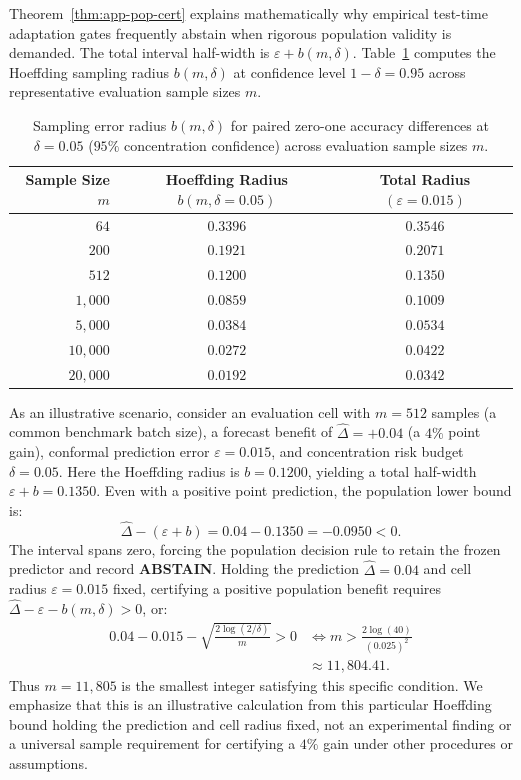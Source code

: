 Theorem~\ref{thm:app-pop-cert} explains mathematically why empirical test-time adaptation gates frequently abstain
when rigorous population validity is demanded. The total interval half-width is $\varepsilon + b(m, \delta)$.
Table~\ref{tab:sample-size-hoeffding} computes the Hoeffding sampling radius $b(m, \delta)$ at confidence level
$1 - \delta = 0.95$ across representative evaluation sample sizes $m$.

\begin{table}[!ht]
\centering
\footnotesize
\caption{Sampling error radius $b(m, \delta)$ for paired zero-one accuracy differences at $\delta = 0.05$
($95\%$ concentration confidence) across evaluation sample sizes $m$.}
\label{tab:sample-size-hoeffding}
\begin{tabular}{@{}rcc@{}}
\toprule
\shortstack{Sample\\Size $m$} & \shortstack{Hoeffding Radius\\$b(m, \delta=0.05)$} & \shortstack{Total Radius\\$(\varepsilon = 0.015)$} \\
\midrule
$64$ & $0.3396$ & $0.3546$ \\
$200$ & $0.1921$ & $0.2071$ \\
$512$ & $0.1200$ & $0.1350$ \\
$1{,}000$ & $0.0859$ & $0.1009$ \\
$5{,}000$ & $0.0384$ & $0.0534$ \\
$10{,}000$ & $0.0272$ & $0.0422$ \\
$20{,}000$ & $0.0192$ & $0.0342$ \\
\bottomrule
\end{tabular}
\end{table}

As an illustrative scenario, consider an evaluation cell with $m = 512$ samples (a common benchmark batch size),
a forecast benefit of $\widehat\Delta = +0.04$ (a $4\%$ point gain), conformal prediction error $\varepsilon = 0.015$,
and concentration risk budget $\delta = 0.05$. Here the Hoeffding radius is $b = 0.1200$, yielding a total half-width
$\varepsilon + b = 0.1350$. Even with a positive point prediction, the population lower bound is:
\[
 \widehat\Delta - (\varepsilon + b) = 0.04 - 0.1350 = -0.0950 < 0.
\]
The interval spans zero, forcing the population decision rule to retain the frozen predictor and record \textbf{ABSTAIN}.
Holding the prediction $\widehat\Delta = 0.04$ and cell radius $\varepsilon = 0.015$ fixed, certifying a positive
population benefit requires $\widehat\Delta - \varepsilon - b(m, \delta) > 0$, or:
\begin{align*}
 0.04 - 0.015 - \sqrt{\frac{2\log(2/\delta)}{m}} > 0 &\iff m > \frac{2\log(40)}{(0.025)^2} \\
 &\approx 11{,}804.41.
\end{align*}
Thus $m = 11{,}805$ is the smallest integer satisfying this specific condition. We emphasize that this is an
illustrative calculation from this particular Hoeffding bound holding the prediction and cell radius fixed, not
an experimental finding or a universal sample requirement for certifying a $4\%$ gain under other procedures or assumptions.

